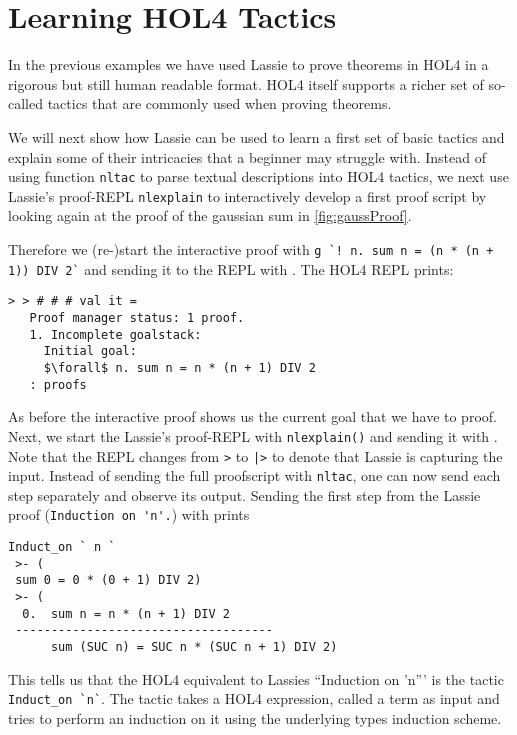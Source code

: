 \section{Learning HOL4 Tactics}

In the previous examples we have used Lassie to prove theorems in HOL4 in a
rigorous but still human readable format.
HOL4 itself supports a richer set of so-called tactics that are commonly used
when proving theorems.

We will next show how Lassie can be used to learn a first set of basic tactics
and explain some of their intricacies that a beginner may struggle with.
Instead of using function \lstinline{nltac} to parse textual descriptions into HOL4
tactics, we next use Lassie's proof-REPL \lstinline{nlexplain} to interactively
develop a first proof script by looking again at the proof of the gaussian sum
in \autoref{fig:gaussProof}.

Therefore we (re-)start the interactive proof with \lstinline{g `! n. sum n = (n * (n + 1)) DIV 2`}
and sending it to the REPL with .
The HOL4 REPL prints:
\begin{lstlisting}[frame=single, mathescape=true, deletekeywords={Proof}]
> > # # # val it =
   Proof manager status: 1 proof.
   1. Incomplete goalstack:
     Initial goal:
     $\forall$ n. sum n = n * (n + 1) DIV 2
   : proofs
\end{lstlisting}

As before the interactive proof shows us the current goal that we have to proof.
Next, we start the Lassie's proof-REPL with \lstinline{nlexplain()} and
sending it with .
Note that the REPL changes from \lstinline{>} to \lstinline{|>} to denote that
Lassie is capturing the input.
Instead of sending the full proofscript with \lstinline{nltac}, one can now send
each step separately and observe its output.
Sending the first step from the Lassie proof (\lstinline{Induction on 'n'.}) with
 prints
%
\begin{lstlisting}[frame=single]
Induct_on ` n `
 >- (
 sum 0 = 0 * (0 + 1) DIV 2)
 >- (
  0.  sum n = n * (n + 1) DIV 2
 ------------------------------------
      sum (SUC n) = SUC n * (SUC n + 1) DIV 2)
\end{lstlisting}

This tells us that the HOL4 equivalent to Lassies ``Induction on 'n''' is the
tactic \lstinline{Induct_on `n`}.
The tactic takes a HOL4 expression, called a term as input and tries to perform
an induction on it using the underlying types induction scheme.

